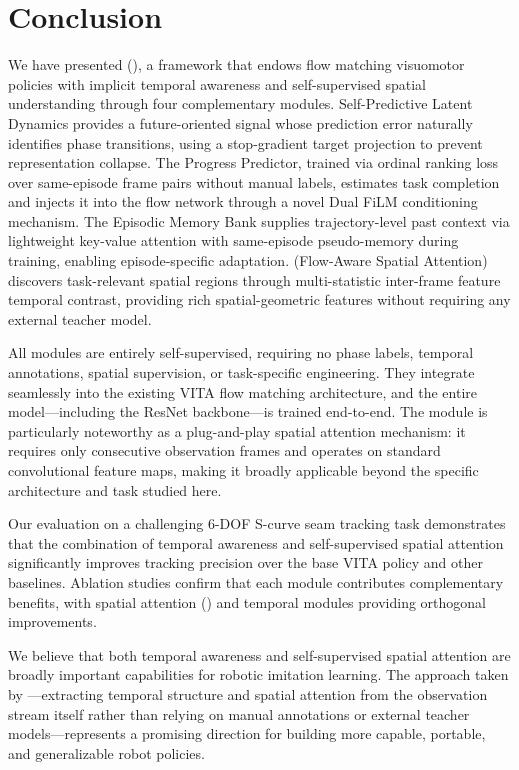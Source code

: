 \section{Conclusion}
\label{sec:conclusion}

We have presented \method{} (\methodfull{}), a framework that endows flow matching visuomotor policies with implicit temporal awareness and self-supervised spatial understanding through four complementary modules. Self-Predictive Latent Dynamics provides a future-oriented signal whose prediction error naturally identifies phase transitions, using a stop-gradient target projection to prevent representation collapse. The Progress Predictor, trained via ordinal ranking loss over same-episode frame pairs without manual labels, estimates task completion and injects it into the flow network through a novel Dual FiLM conditioning mechanism. The Episodic Memory Bank supplies trajectory-level past context via lightweight key-value attention with same-episode pseudo-memory during training, enabling episode-specific adaptation. \fasa{} (Flow-Aware Spatial Attention) discovers task-relevant spatial regions through multi-statistic inter-frame feature temporal contrast, providing rich spatial-geometric features without requiring any external teacher model.

All modules are entirely self-supervised, requiring no phase labels, temporal annotations, spatial supervision, or task-specific engineering. They integrate seamlessly into the existing VITA flow matching architecture, and the entire model---including the ResNet backbone---is trained end-to-end. The \fasa{} module is particularly noteworthy as a plug-and-play spatial attention mechanism: it requires only consecutive observation frames and operates on standard convolutional feature maps, making it broadly applicable beyond the specific architecture and task studied here.

Our evaluation on a challenging 6-DOF S-curve seam tracking task demonstrates that the combination of temporal awareness and self-supervised spatial attention significantly improves tracking precision over the base VITA policy and other baselines. Ablation studies confirm that each module contributes complementary benefits, with spatial attention (\fasa{}) and temporal modules providing orthogonal improvements.

We believe that both temporal awareness and self-supervised spatial attention are broadly important capabilities for robotic imitation learning. The approach taken by \method{}---extracting temporal structure and spatial attention from the observation stream itself rather than relying on manual annotations or external teacher models---represents a promising direction for building more capable, portable, and generalizable robot policies.
